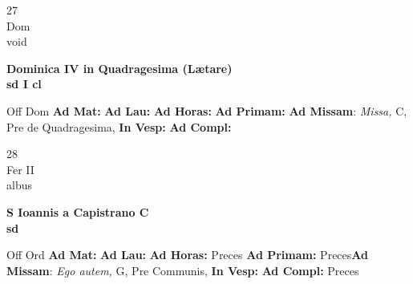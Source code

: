 \documentclass[10pt, openany]{book}
\begin{document}
    \begin{center}
        \begin{minipage}{3.5in}
            \vspace{2em}
            \begin{minipage}{0.5in}
                {\Huge 27} \\
                {\normalsize Dom} \\
                {\normalsize void}
            \end{minipage}
            \begin{minipage}{3.0in}
                \textbf{ \large Dominica IV in Quadragesima (Lætare) \\
                \textnormal{\normalsize sd I cl}} \\ 
            \end{minipage}
            \begin{justify}Off Dom
                \textbf{Ad Mat: }
                \textbf{Ad Lau: }
                \textbf{Ad Horas: }
                \textbf{Ad Primam: }\textbf{Ad Missam}: \textit{Missa,} C, Pre de Quadragesima,  
                \textbf{In Vesp: }
                \textbf{Ad Compl: }
            \end{justify}
        \end{minipage}
    \end{center}

    \begin{center}
        \begin{minipage}{3.5in}
            \vspace{2em}
            \begin{minipage}{0.5in}
                {\Huge 28} \\
                {\normalsize Fer II} \\
                {\normalsize albus}
            \end{minipage}
            \begin{minipage}{3.0in}
                \textbf{ \large S Ioannis a Capistrano C \\
                \textnormal{\normalsize sd}} \\ 
            \end{minipage}
            \begin{justify}Off Ord
                \textbf{Ad Mat: }
                \textbf{Ad Lau: }
                \textbf{Ad Horas: }Preces
                \textbf{Ad Primam: }Preces\textbf{Ad Missam}: \textit{Ego autem,} G, Pre Communis,  
                \textbf{In Vesp: }
                \textbf{Ad Compl: }Preces
            \end{justify}
        \end{minipage}
    \end{center}
\end{document}
